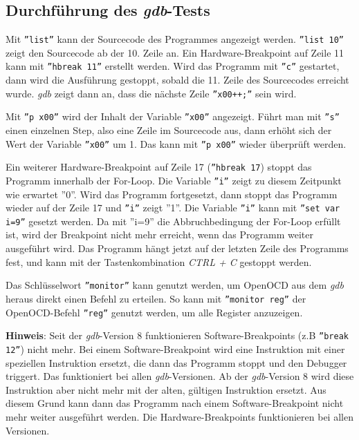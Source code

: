 \subsection{Durchführung des \textit{gdb}-Tests}
Mit \texttt{''list''} kann der Sourcecode des Programmes angezeigt werden.
\texttt{''list 10''} zeigt den Sourcecode ab der 10. Zeile an.
Ein Hardware-Breakpoint auf Zeile 11 kann mit \texttt{''hbreak 11''} erstellt werden.
Wird das Programm mit \texttt{''c''} gestartet, dann wird die Ausführung gestoppt, sobald die 11. Zeile des Sourcecodes erreicht wurde.
\textit{gdb} zeigt dann an, dass die nächste Zeile \texttt{''x00++;''} sein wird.

Mit \texttt{''p x00''} wird der Inhalt der Variable \texttt{''x00''} angezeigt.
Führt man mit \texttt{''s''} einen einzelnen Step, also eine Zeile im Sourcecode aus, dann erhöht sich der Wert der Variable \texttt{''x00''} um 1.
Das kann mit \texttt{''p x00''}  wieder überprüft werden.


Ein weiterer Hardware-Breakpoint auf Zeile 17 (\texttt{''hbreak 17}) stoppt das Programm innerhalb der For-Loop.
Die Variable \texttt{''i''} zeigt zu diesem Zeitpunkt wie erwartet ''0''.
Wird das Programm fortgesetzt, dann stoppt das Programm wieder auf der Zeile 17 und \texttt{''i''} zeigt ''1''.
Die Variable \texttt{''i''} kann mit \texttt{''set var i=9''} gesetzt werden.
Da mit ''i=9'' die Abbruchbedingung der For-Loop erfüllt ist, wird der Breakpoint nicht mehr erreicht, wenn das Programm weiter ausgeführt wird.
Das Programm hängt jetzt auf der letzten Zeile des Programms fest, und kann mit der Tastenkombination \textit{CTRL + C} gestoppt werden.

Das Schlüsselwort \texttt{''monitor''} kann genutzt werden, um OpenOCD aus dem \textit{gdb} heraus direkt einen Befehl zu erteilen.
So kann mit \texttt{''monitor reg''} der OpenOCD-Befehl \texttt{''reg''} genutzt werden, um alle Register anzuzeigen.

\textbf{Hinweis}: 
Seit der \textit{gdb}-Version 8 funktionieren Software-Breakpoints (z.B \texttt{''break 12''}) nicht mehr.
Bei einem Software-Breakpoint wird eine Instruktion mit einer speziellen Instruktion ersetzt, die dann das Programm stoppt und den Debugger triggert.
Das funktioniert bei allen \textit{gdb}-Versionen.
Ab der \textit{gdb}-Version 8 wird diese Instruktion aber nicht mehr mit der alten, gültigen Instruktion ersetzt.
Aus diesem Grund kann dann das Programm nach einem Software-Breakpoint nicht mehr weiter ausgeführt werden.
Die Hardware-Breakpoints funktionieren bei allen Versionen.


